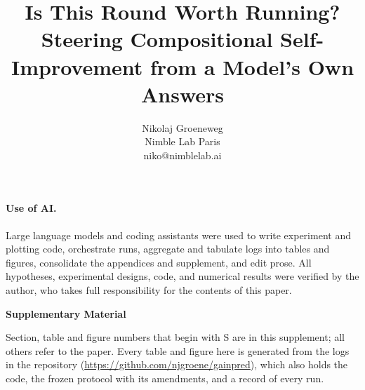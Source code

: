 \documentclass{article}
\title{Is This Round Worth Running? Steering Compositional Self-Improvement from a Model's Own Answers}
\author{%
  Nikolaj Groeneweg \\
  Nimble Lab Paris \\
  niko@nimblelab.ai \\
}
\newcommand{\repourl}{\url{https://github.com/njgroene/gainpred}}
\begin{document}
\maketitle









\paragraph{Use of AI.}
Large language models and coding assistants were used to write experiment and
plotting code, orchestrate runs, aggregate and tabulate logs into tables and
figures, consolidate the appendices and supplement, and edit prose. All
hypotheses, experimental designs, code, and numerical results were verified by
the author, who takes full responsibility for the contents of this paper.






\begin{appendices}

\end{appendices}

\clearpage
\makeatletter
\let\gp@label\label
\let\gp@ref\ref
\renewcommand{\label}[1]{\gp@label{S-#1}}
\renewcommand{\ref}[1]{\@ifundefined{r@S-#1}{\gp@ref{#1}}{\gp@ref{S-#1}}}
\makeatother
\setcounter{section}{0}
\setcounter{table}{0}
\setcounter{figure}{0}
\renewcommand{\thesection}{S\arabic{section}}
\renewcommand{\thetable}{S\arabic{table}}
\renewcommand{\thefigure}{S\arabic{figure}}
\renewcommand{\theHsection}{S\arabic{section}}   %
\renewcommand{\theHtable}{S\arabic{table}}
\renewcommand{\theHfigure}{S\arabic{figure}}

\begin{center}
  {\Large\bfseries Supplementary Material}
\end{center}

\noindent Section, table and figure numbers that begin with S are in this
supplement; all others refer to the paper. Every table and figure here is
generated from the logs in the repository (\repourl), which also holds the
code, the frozen protocol with its amendments, and a record of every run.


\end{document}
